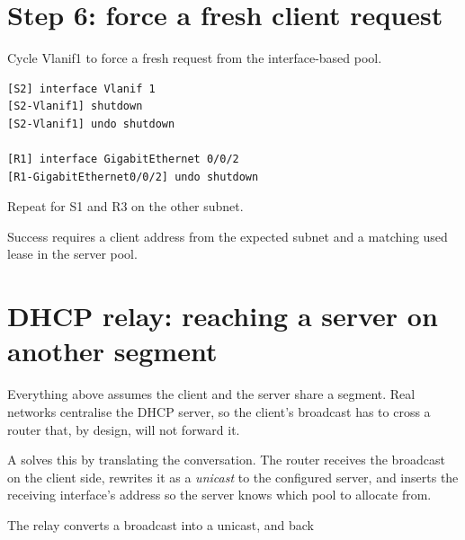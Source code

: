 \section{Step 6: force a fresh client request}
Cycle Vlanif1 to force a fresh request from the interface-based pool.
\begin{lstlisting}[style=dcnterminal]
[S2] interface Vlanif 1
[S2-Vlanif1] shutdown
[S2-Vlanif1] undo shutdown

[R1] interface GigabitEthernet 0/0/2
[R1-GigabitEthernet0/0/2] undo shutdown
\end{lstlisting}
Repeat for S1 and R3 on the other subnet.

\begin{verification}
Success requires a client address from the expected subnet and a matching used lease in the server pool.
\end{verification}

\section{DHCP relay: reaching a server on another segment}\label{sec:dhcp-relay}

Everything above assumes the client and the server share a segment. Real networks centralise the DHCP server, so the client's broadcast has to cross a router that, by design, will not forward it.

A  solves this by translating the conversation. The router receives the broadcast on the client side, rewrites it as a \emph{unicast} to the configured server, and inserts the receiving interface's address so the server knows which pool to allocate from.

\begin{netfigure}{The relay converts a broadcast into a unicast, and back}
\end{netfigure}

